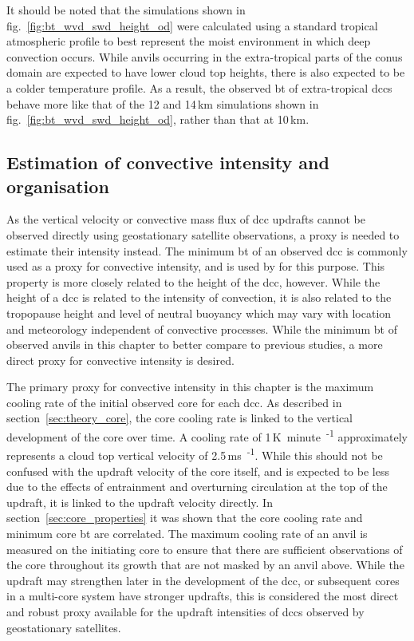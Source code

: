 It should be noted that the simulations shown in fig.~\ref{fig:bt_wvd_swd_height_od} were calculated using a standard tropical atmospheric profile to best represent the moist environment in which deep convection occurs.
While anvils occurring in the extra-tropical parts of the \acrshort{conus} domain are expected to have lower cloud top heights, there is also expected to be a colder temperature profile.
As a result, the observed \acrshort{bt} of extra-tropical \acrshort{dcc}s behave more like that of the 12 and 14\,\unit{km} simulations shown in fig.~\ref{fig:bt_wvd_swd_height_od}, rather than that at 10\,\unit{km}.


\subsection{Estimation of convective intensity and organisation} \label{sec:method_proxies}

As the vertical velocity or convective mass flux of \acrshort{dcc} updrafts cannot be observed directly using geostationary satellite observations, a proxy is needed to estimate their intensity instead.
The minimum \acrshort{bt} of an observed \acrshort{dcc} is commonly used as a proxy for convective intensity, and is used by \citet{protopapadaki_upper_2017} for this purpose.
This property is more closely related to the height of the \acrshort{dcc}, however.
While the height of a \acrshort{dcc} is related to the intensity of convection, it is also related to the tropopause height and level of neutral buoyancy which may vary with location and meteorology independent of convective processes.
While the minimum \acrshort{bt} of observed anvils in this chapter to better compare to previous studies, a more direct proxy for convective intensity is desired.

The primary proxy for convective intensity in this chapter is the maximum cooling rate of the initial observed core for each \acrshort{dcc}.
As described in section~\ref{sec:theory_core}, the core cooling rate is linked to the vertical development of the core over time.
A cooling rate of 1\,\unit{K minute\textsuperscript{-1}} approximately represents a cloud top vertical velocity of 2.5\,\unit{ms\textsuperscript{-1}}.
While this should not be confused with the updraft velocity of the core itself, and is expected to be less due to the effects of entrainment and overturning circulation at the top of the updraft, it is linked to the updraft velocity directly.
In section~\ref{sec:core_properties} it was shown that the core cooling rate and minimum core \acrshort{bt} are correlated.
The maximum cooling rate of an anvil is measured on the initiating core to ensure that there are sufficient observations of the core throughout its growth that are not masked by an anvil above.
While the updraft may strengthen later in the development of the \acrshort{dcc}, or subsequent cores in a multi-core system have stronger updrafts, this is considered the most direct and robust proxy available for the updraft intensities of \acrshort{dcc}s observed by geostationary satellites.

